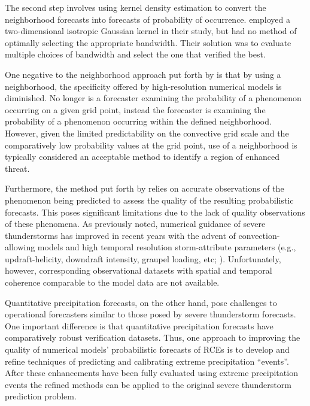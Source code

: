 The second step involves using kernel density estimation to convert the neighborhood forecasts into forecasts of probability of occurrence.
\cite{Sobash2011} employed a two-dimensional isotropic Gaussian kernel in their study, but had no method of optimally selecting the appropriate bandwidth.
Their solution was to evaluate multiple choices of bandwidth and select the one that verified the best.


One negative to the neighborhood approach put forth by \cite{Sobash2011} is that by using a neighborhood, the specificity offered by high-resolution numerical models is diminished.
No longer is a forecaster examining the probability of a phenomenon occurring on a given grid point, instead the forecaster is examining the probability of a phenomenon occurring within the defined neighborhood.
However, given the limited predictability on the convective grid scale and the comparatively low probability values at the grid point, use of a neighborhood is typically considered an acceptable method to identify a region of enhanced threat.


Furthermore, the method put forth by \cite{Sobash2011} relies on accurate observations of the phenomenon being predicted to assess the quality of the resulting probabilistic forecasts.
This poses significant limitations due to the lack of quality observations of these phenomena.
As previously noted, numerical guidance of severe thunderstorms has improved in recent years with the advent of convection-allowing models and high temporal resolution storm-attribute parameters (e.g., updraft-helicity, downdraft intensity, graupel loading, etc; \citealp{Kain2010}).
Unfortunately, however, corresponding observational datasets with spatial and temporal coherence comparable to the model data are not available.


Quantitative precipitation forecasts, on the other hand, pose challenges to operational forecasters similar to those posed by severe thunderstorm forecasts.
One important difference is that quantitative precipitation forecasts have comparatively robust verification datasets.
Thus, one approach to improving the quality of numerical models' probabilistic forecasts of RCEs is to develop and refine techniques of predicting and calibrating extreme precipitation ``events''.
After these enhancements have been fully evaluated using extreme precipitation events the refined methods can be applied to the original severe thunderstorm prediction problem.


